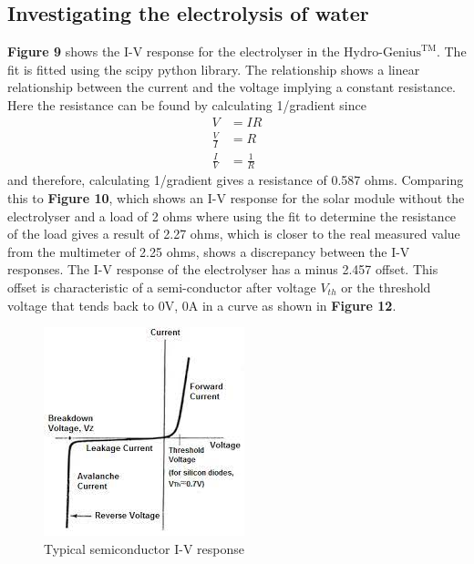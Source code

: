 \documentclass{article}
\begin{document}
    \subsection{Investigating the electrolysis of water}
    \textbf{Figure 9} shows the I-V response for the electrolyser in the \(\text{Hydro-Genius}^{\text{TM}}\).
    The fit is fitted using the scipy python library. The relationship shows a linear relationship between the current 
    and the voltage implying a constant resistance. Here the resistance can be found by calculating 1/gradient since
    \begin{equation}
        \begin{aligned}
            V & = I R \\
            \frac{V}{I} & = R \\ 
            \frac{I}{V} & = \frac{1}{R}
        \end{aligned}
    \end{equation}
    and therefore, calculating 1/gradient gives a resistance of 0.587 ohms.
    \newline \newline Comparing this to \textbf{Figure 10}, which shows an I-V response for the solar module without the electrolyser and a load of 2 ohms where
    using the fit to determine the resistance of the load gives a result of 2.27 ohms, which is closer to the real measured value from the multimeter of 2.25 ohms,
    shows a discrepancy between the I-V responses. The I-V response of the electrolyser has a minus 2.457 offset.
    This offset is characteristic of a semi-conductor after voltage \(V_{th}\) or the threshold voltage that tends back to 0V, 0A in a curve as shown in \textbf{Figure 12}.
    \begin{figure}
        \centering
        \includegraphics[scale=1]{download.jpeg}
        \caption{Typical semiconductor I-V response \cite{mini}}
    \end{figure}
\end{document}
